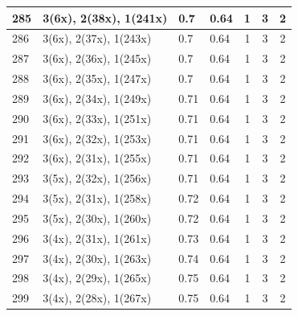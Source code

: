 \begin{small}
\begin{longtable}{|p{0.5cm}|p{9cm}|p{1.3cm}|p{1.3cm}|c|c|c|}
  285 & 3(6x), 2(38x), 1(241x) & \cellcolor{colorBad}  0.7 & \cellcolor{colorBad} 0.64 & 1 & 3 & \cellcolor{colorGood} 2 \\   \hline
  286 & 3(6x), 2(37x), 1(243x) & \cellcolor{colorBad}  0.7 & \cellcolor{colorBad} 0.64 & 1 & 3 & \cellcolor{colorGood} 2 \\   \hline
  287 & 3(6x), 2(36x), 1(245x) & \cellcolor{colorBad}  0.7 & \cellcolor{colorBad} 0.64 & 1 & 3 & \cellcolor{colorGood} 2 \\   \hline
  288 & 3(6x), 2(35x), 1(247x) & \cellcolor{colorBad}  0.7 & \cellcolor{colorBad} 0.64 & 1 & 3 & \cellcolor{colorGood} 2 \\   \hline
  289 & 3(6x), 2(34x), 1(249x) & \cellcolor{colorBad}  0.71 & \cellcolor{colorBad} 0.64 & 1 & 3 & \cellcolor{colorGood} 2 \\   \hline
  290 & 3(6x), 2(33x), 1(251x) & \cellcolor{colorBad}  0.71 & \cellcolor{colorBad} 0.64 & 1 & 3 & \cellcolor{colorGood} 2 \\   \hline
  291 & 3(6x), 2(32x), 1(253x) & \cellcolor{colorBad}  0.71 & \cellcolor{colorBad} 0.64 & 1 & 3 & \cellcolor{colorGood} 2 \\   \hline
  292 & 3(6x), 2(31x), 1(255x) & \cellcolor{colorBad}  0.71 & \cellcolor{colorBad} 0.64 & 1 & 3 & \cellcolor{colorGood} 2 \\   \hline
  293 & 3(5x), 2(32x), 1(256x) & \cellcolor{colorBad}  0.71 & \cellcolor{colorBad} 0.64 & 1 & 3 & \cellcolor{colorGood} 2 \\   \hline
  294 & 3(5x), 2(31x), 1(258x) & \cellcolor{colorBad}  0.72 & \cellcolor{colorBad} 0.64 & 1 & 3 & \cellcolor{colorGood} 2 \\   \hline
  295 & 3(5x), 2(30x), 1(260x) & \cellcolor{colorBad}  0.72 & \cellcolor{colorBad} 0.64 & 1 & 3 & \cellcolor{colorGood} 2 \\   \hline
  296 & 3(4x), 2(31x), 1(261x) & \cellcolor{colorBad}  0.73 & \cellcolor{colorBad} 0.64 & 1 & 3 & \cellcolor{colorGood} 2 \\   \hline
  297 & 3(4x), 2(30x), 1(263x) & \cellcolor{colorBad}  0.74 & \cellcolor{colorBad} 0.64 & 1 & 3 & \cellcolor{colorGood} 2 \\   \hline
  298 & 3(4x), 2(29x), 1(265x) & \cellcolor{colorBad}  0.75 & \cellcolor{colorBad} 0.64 & 1 & 3 & \cellcolor{colorGood} 2 \\   \hline
  299 & 3(4x), 2(28x), 1(267x) & \cellcolor{colorBad}  0.75 & \cellcolor{colorBad} 0.64 & 1 & 3 & \cellcolor{colorGood} 2 \\   \hline

\end{longtable}
\end{small}
